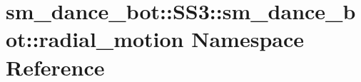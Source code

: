 \hypertarget{namespacesm__dance__bot_1_1SS3_1_1sm__dance__bot_1_1radial__motion}{}\section{sm\+\_\+dance\+\_\+bot\+:\+:S\+S3\+:\+:sm\+\_\+dance\+\_\+bot\+:\+:radial\+\_\+motion Namespace Reference}
\label{namespacesm__dance__bot_1_1SS3_1_1sm__dance__bot_1_1radial__motion}
